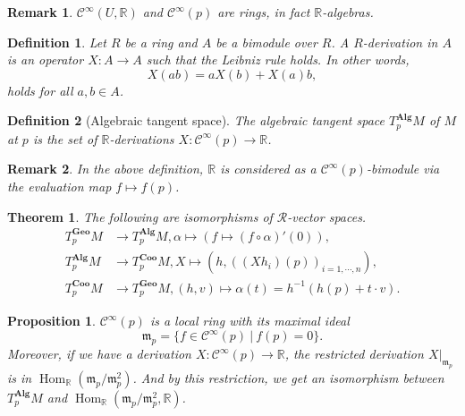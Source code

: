 \documentclass{article}
\newtheorem{theorem}{Theorem}[section]
\newtheorem{proposition}{Proposition}[section]
\newtheorem{definition}{Definition}[section]
\newtheorem{remark}{Remark}[section]
\numberwithin{equation}{section}
\DeclareMathOperator{\Hom}{Hom}
\begin{document}
\begin{remark}
$\mathcal{C}^\infty(U,\mathbb{R})$ and $\mathcal{C}^\infty(p)$ are rings, in fact $\mathbb{R}$-algebras. 
\end{remark}

\begin{definition}
Let $R$ be a ring and $A$ be a bimodule over $R$. A $R$-derivation in $A$ is an operator $X:A\to A$ such that the Leibniz rule holds. In other words, 
\begin{equation*}
X(ab) = aX(b)+X(a)b,
\end{equation*}
holds for all $a,b\in A$.
\end{definition}

\begin{definition}[Algebraic tangent space]
The algebraic tangent space $T^{\mathbf{Alg}}_pM$ of $M$ at $p$ is the set of $\mathbb{R}$-derivations $X:\mathcal{C}^\infty(p)\to\mathbb{R}$. 
\end{definition}

\begin{remark}
In the above definition, $\mathbb{R}$ is considered as a $\mathcal{C}^\infty(p)$-bimodule via the evaluation map $f\mapsto f(p)$.
\end{remark}

\begin{theorem}
The following are isomorphisms of $\mathcal{R}$-vector spaces.
\begin{align*}
T^{\mathbf{Geo}}_pM&\to T^{\mathbf{Alg}}_pM, \alpha\mapsto(f\mapsto (f\circ\alpha)'(0)),\\
T^{\mathbf{Alg}}_pM&\to T^{\mathbf{Coo}}_pM, X\mapsto (h, ((Xh_i)(p))_{i=1,\cdots,n}),\\
T^{\mathbf{Coo}}_pM&\to T^{\mathbf{Geo}}_pM, (h,v)\mapsto \alpha(t)=h^{-1}(h(p)+t\cdot v).
\end{align*}
\end{theorem}

\begin{proposition}
$\mathcal{C}^\infty(p)$ is a local ring with its maximal ideal
\begin{equation*}
\mathfrak{m}_p=\{f\in\mathcal{C}^\infty(p)\:|\: f(p) = 0\}.
\end{equation*}
Moreover, if we have a derivation $X:\mathcal{C}^\infty(p)\to\mathbb{R}$, the restricted derivation $X|_{\mathfrak{m}_p}$ is in
$\Hom_{\mathbb{R}}(\mathfrak{m}_p/\mathfrak{m}_p^2)$. 
And by this restriction, we get an isomorphism between $T^{\mathbf{Alg}}_pM$ and $\Hom_{\mathbb{R}}(\mathfrak{m}_p/\mathfrak{m}_p^2,\mathbb{R})$.
\end{proposition} 
\end{document}
